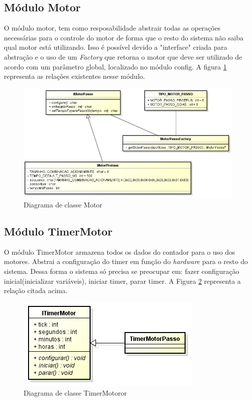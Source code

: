 \subsection{Módulo Motor}

O módulo motor, tem como resposabilidade abstrair todas as operações necessárias para o controle do motor de forma que o resto do sistema não saiba qual motor está utilizando. Isso é possível devido a "interface" criada para abstração e o uso de um \emph{Factory} que retorna o motor que deve ser utilizado de acordo com um parâmetro global, localizado no módulo config. A figura \ref{fig:classemotor} representa as relações existentes nesse módulo. \newpage


\begin{figure}[htp]
	\centering
	\includegraphics[scale=1]{images/classe_motor.png}
	\caption{Diagrama de classe Motor}	
	\label{fig:classemotor}
\end{figure}

\subsection{Módulo TimerMotor}

O módulo TimerMotor armazena todos os dados do contador para o uso dos motores. Abstrai a configuração do timer em função do \emph{hardware} para o resto do sistema. Dessa forma o sistema só precisa se preocupar em: fazer configuração inicial(inicializar variáveis), iniciar timer, parar timer. A Figura \ref{fig:classe_timer_motor} representa a relação citada acima.

\begin{figure}[htp]
	\centering
	\includegraphics[scale=1]{images/classe_timer_motor.png}
	\caption{Diagrama de classe TimerMotoror}	
	\label{fig:classe_timer_motor}
\end{figure}


